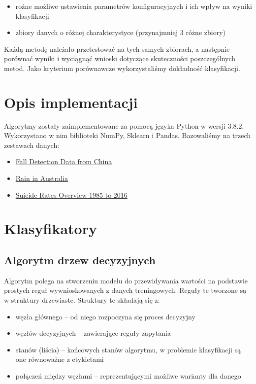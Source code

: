 \documentclass[a4paper,11pt]{article}
\begin{document}
\begin{itemize}
    \item rożne możliwe ustawienia parametrów konfiguracyjnych i ich wpływ na wyniki klasyfikacji
    \item zbiory danych o różnej charakterystyce (przynajmniej 3 różne zbiory)
\end{itemize}

Każdą metodę należało przetestować na tych samych zbiorach, a następnie porównać wyniki i wyciągnąć wnioski dotyczące skuteczności poszczególnych metod. Jako kryterium porównawcze wykorzystaliśmy dokładność klasyfikacji.

\section{Opis implementacji}
Algorytmy zostały zaimplementowane za pomocą języka Python w wersji 3.8.2.
Wykorzystano w nim biblioteki NumPy, Sklearn i Pandas. Bazowaliśmy na trzech zestawach danych: 
\begin{itemize}
    \item{\href{https://www.kaggle.com/pitasr/falldata}{Fall Detection Data from China}}
    \item{\href{https://www.kaggle.com/jsphyg/weather-dataset-rattle-package}{Rain in Australia}}
    \item{\href{https://www.kaggle.com/russellyates88/suicide-rates-overview-1985-to-2016}{Suicide Rates Overview 1985 to 2016}}
\end{itemize}

\section{Klasyfikatory}

\subsection{Algorytm drzew decyzyjnych}
Algorytm polega na stworzeniu modelu do przewidywania wartości na podstawie prostych reguł wywnioskowanych z danych treningowych. Reguły te tworzone są w struktury drzewiaste. Struktury te składają się z:

\begin{itemize}
    \item węzła głównego -- od niego rozpoczyna się proces decyzyjny
    \item węzłów decyzyjnych -- zawierające reguły-zapytania
    \item stanów (liścia) -- końcowych stanów algorytmu, w problemie klasyfikacji są one równoważne z etykietami
    \item połączeń między węzłami -- reprezentującymi możliwe warianty dla danego
\end{itemize}
\end{document}
